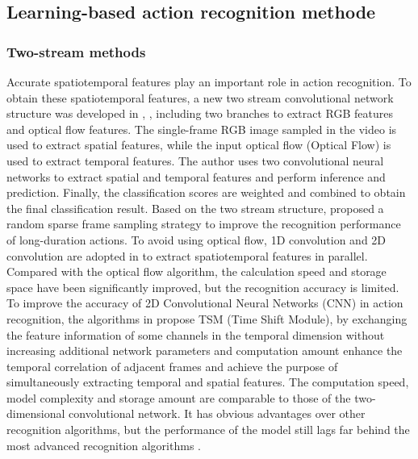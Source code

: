 \documentclass[a4paper]{cas-sc}
\begin{document}
\subsection{Learning-based action recognition methode}
\subsubsection{Two-stream methods}
Accurate spatiotemporal features play an important role in action recognition. 
To obtain these spatiotemporal features, a new two stream convolutional network structure was developed in \cite{simonyan2014two}, 
\cite{cai2018multi}, 
including two branches to extract RGB features and optical flow features. 
The single-frame RGB image sampled in the video is used to extract spatial features, 
while the input optical flow (Optical Flow) is used to extract temporal features. 
The author uses two convolutional neural networks to extract spatial and temporal features and perform inference and prediction. 
Finally, the classification scores are weighted and combined to obtain the final classification result. 
Based on the two stream structure, \cite{jaderberg2015spatial} proposed a random sparse frame sampling strategy to improve the recognition performance of 
long-duration actions. 
To avoid using optical flow, 1D convolution and 2D convolution are adopted in \cite{jiang2019stm} to extract spatiotemporal features in parallel.
Compared with the optical flow algorithm, the calculation speed and storage space have been significantly improved, 
but the recognition accuracy is limited. 
To improve the accuracy of 2D Convolutional Neural Networks (CNN) in action recognition, 
the algorithms in \cite{lin2019tsm} propose TSM (Time Shift Module), 
by exchanging the feature information of some channels in the temporal dimension without increasing additional network parameters 
and computation amount enhance the temporal correlation of adjacent frames and achieve the purpose of simultaneously 
extracting temporal and spatial features. 
The computation speed, model complexity and storage amount are comparable to those of the two-dimensional convolutional network.
It has obvious advantages over other recognition algorithms, 
but the performance of the model still lags far behind the most advanced recognition algorithms .
\end{document}
